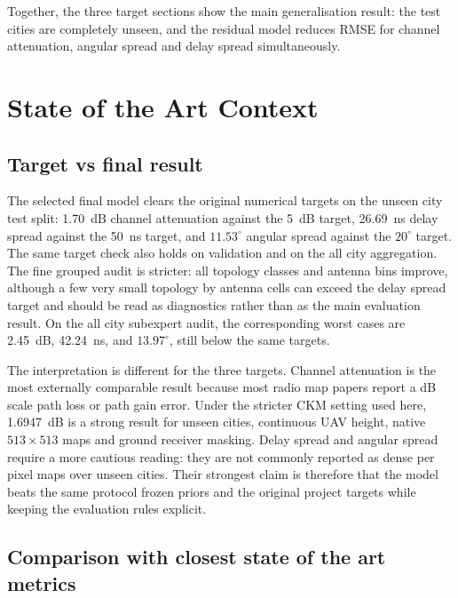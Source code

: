 Together, the three target sections show the main generalisation result: the
test cities are completely unseen, and the residual model reduces RMSE for
channel attenuation, angular spread and delay spread simultaneously.

\section{State of the Art Context}

\subsection{Target vs final result}

The selected final model clears the original numerical targets on the unseen city
test split: \SI{1.70}{dB} channel attenuation against the \SI{5}{dB} target,
\SI{26.69}{ns} delay spread against the \SI{50}{ns} target, and
\(11.53^\circ\) angular spread against the \(20^\circ\) target. The same
target check also holds on validation and on the all city aggregation. The
fine grouped audit is stricter: all topology classes and antenna bins improve,
although a few very small topology by antenna cells can exceed the delay spread
target and should be read as diagnostics rather than as the main evaluation
result. On the all city
subexpert audit, the corresponding worst cases are \SI{2.45}{dB},
\SI{42.24}{ns}, and \(13.97^\circ\), still below the same targets.

The interpretation is different for the three targets. Channel attenuation is
the most externally comparable result because most radio map papers report a
dB scale path loss or path gain error. Under the stricter CKM setting used
here, \SI{1.6947}{dB} is a strong result for unseen cities, continuous UAV
height, native \(513\times513\) maps and ground receiver masking. Delay spread
and angular spread require a more cautious reading: they are not commonly
reported as dense per pixel maps over unseen cities. Their strongest claim is
therefore that the model beats the same protocol frozen priors and the original
project targets while keeping the evaluation rules explicit.

\subsection{Comparison with closest state of the art metrics}

